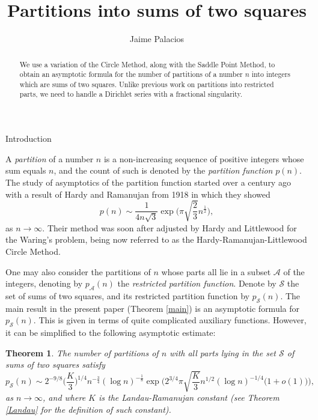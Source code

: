 \documentclass[12pt,reqno]{amsart}
\title{Partitions into sums of two squares}
\author{Jaime Palacios}
\makeatletter
\def\section{\@startsection{section}{1}
  \z@{.7\linespacing\@plus\linespacing}{.5\linespacing}
  {\normalfont\scshape\bfseries}}
\newtheorem{theorem}{Theorem}[section]
\makeatother
\begin{document}
\begin{abstract}
     We use a variation of the Circle Method, along with the Saddle Point Method, to obtain an asymptotic formula for the number of partitions of a number $n$ into integers which are sums of two squares. Unlike previous work on partitions into restricted parts, we need to handle a Dirichlet series with a fractional singularity.
\end{abstract}


\maketitle



\section{Introduction}

 A \textit{partition} of a number $n$ is a non-increasing sequence of positive integers whose sum equals $n$, and the count   of such is denoted by the \textit{partition function} $p(n)$. 
The study of asymptotics of the partition function started over a century ago with a result of Hardy and Ramanujan from 1918 \cite{hardy} in which they showed
 \begin{equation*}
     p(n)\sim \frac{1}{4n\sqrt{3}}\exp\Big(\pi \sqrt{\frac{2}{3}}n^{\frac{1}{2}}\Big),
 \end{equation*}
 as $n\to \infty$. Their method was soon after adjusted by Hardy and Littlewood for the Waring's problem, being now referred to as the Hardy-Ramanujan-Littlewood Circle Method.

 One may also consider the partitions of $n$ whose parts all lie in a subset $\mathcal{A}$ of the integers, denoting by $p_\mathcal{A}(n)$ the \textit{restricted partition function}. Denote by $\mathcal{S}$ the set of sums of two squares, and its restricted partition function by $p_\mathcal{S}(n)$. The main result in the present paper (Theorem \ref{main}) is an asymptotic formula for $p_\mathcal{S}(n)$. This is given in terms of quite complicated auxiliary functions. However, it can be simplified to the following asymptotic estimate:
 
 \begin{theorem}\label{1}
 The number of partitions of $n$ with all parts lying in the set $\mathcal{S}$ of sums of two squares satisfy
    \begin{equation*}
        p_\mathcal{S}(n)\sim 2^{-9/8}\Big(\frac{K}{3}\Big)^{1/4}n^{-\frac{3}{4}}(\log n)^{-\frac{1}{8}} \exp\Bigg(2^{3/4}\pi\sqrt{\frac{K}{3}}n^{1/2}(\log n)^{-1/4}\Big(1+o(1)\Big)\Bigg),
    \end{equation*}
    as $n\to \infty$, and where $K$ is the Landau-Ramanujan constant (see Theorem \ref{Landau} for the definition of such constant).
\end{theorem}
 
\end{document}
